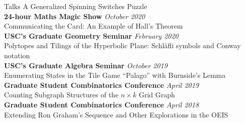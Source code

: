 \documentclass{cv} %
\begin{document}
\begin{rSection}{Talks}
  A Generalized Spinning Switches Puzzle
  \\
  \textbf{24-hour Maths Magic Show} \hfill \textit{October 2020} \\
  Communicating the Card: An Example of Hall's Theorem
  \\
  \textbf{USC's Graduate Geometry Seminar} \hfill \textit{February 2020} \\
  Polytopes and Tilings of the Hyperbolic Plane: Schl\"afli symbols and Conway notation
  \\
  \textbf{USC's Graduate Algebra Seminar} \hfill \textit{October 2019} \\
  Enumerating States in the Tile Game ``Palago'' with Burnside's Lemma
  \\
  \textbf{Graduate Student Combinatorics Conference} \hfill \textit{April 2019} \\
  Counting Subgraph Structures of the \(n \times k\) Grid Graph
  \\
  \textbf{Graduate Student Combinatorics Conference} \hfill \textit{April 2018} \\
  Extending Ron Graham's Sequence and Other Explorations in the OEIS
\end{rSection}
\end{document}
